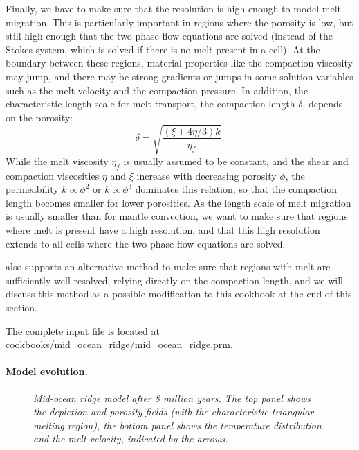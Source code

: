 Finally, we have to make sure that the resolution is high enough to model melt migration.
This is particularly important in regions where the porosity is low, but still high enough that
the two-phase flow equations are solved (instead of the Stokes system, which is solved if there is
no melt present in a cell). At the boundary between these regions, material properties like the
compaction viscosity may jump, and there may be strong gradients or jumps in some solution variables such
as the melt velocity and the compaction pressure. In addition, the characteristic length scale for melt transport,
the compaction length $\delta$, depends on the porosity:
\begin{equation}
\delta = \sqrt{\frac{(\xi+4\eta/3)k}{\eta_f}}.
\end{equation}
While the melt viscosity $\eta_f$ is usually assumed to be constant, and the shear and compaction
viscosities $\eta$ and  $\xi$ increase with decreasing porosity $\phi$, the permeability
$k \propto \phi^2$ or $k \propto \phi^3$ dominates this relation, so that the compaction length becomes
smaller for lower porosities.
As the length scale of melt migration is usually smaller than for mantle convection, we want to make
sure that regions where melt is present have a high resolution, and that this high resolution extends
to all cells where the two-phase flow equations are solved.



\aspect{} also supports an alternative method to make sure that regions with melt are sufficiently
well resolved, relying directly on the compaction length, and we will discuss this method as a possible
modification to this cookbook at the end of this section.

The complete input file is located at \url{cookbooks/mid_ocean_ridge/mid_ocean_ridge.prm}.

\paragraph{Model evolution.}

\begin{figure}
    \centering
    
    \caption{\it Mid-ocean ridge model after 8 million years. The top panel shows the depletion
             and porosity fields (with the characteristic triangular melting region),
             the bottom panel shows the temperature distribution and the melt velocity, indicated
             by the arrows.}
    \label{fig:mid-ocean-ridge}
\end{figure}

